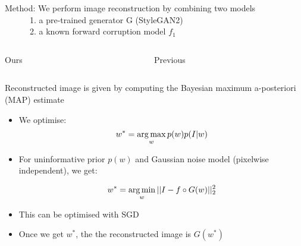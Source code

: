 \begin{frame}{Method: We perform image reconstruction by combining two models\\
\ \ \ \ \ \  1. a pre-trained generator G (StyleGAN2)\\
\ \ \ \ \ \  2. a known forward corruption model $f_1$
}



\begin{columns}[t]
 \begin{column}{0.6\textwidth}
\centering
 
\begin{overprint}
  
  
\end{overprint} 
  Ours
 \end{column}

 \begin{column}{0.3\textwidth}
  \centering

  
  Previous

 
 \end{column}
\end{columns} 
 


 
\end{frame}

\newcommand{\ci}[1]{\circ{#1}}
\newcommand{\wplus}{$\mathcal{W}^{+}$ }
\newcommand{\loss}{\mathcal{L}}

\newcommand{\bit}[1]{\begin{itemize} 
\item #1
\end{itemize}}

\begin{frame}{Reconstructed image is given by computing the Bayesian maximum a-posteriori (MAP) estimate\\
}



\begin{itemize}
 \item We optimise:
$$ w^* = \operatorname*{arg\,max}_w p(w)p(I|w)$$

\item For uninformative prior $p(w)$ and Gaussian noise model (pixelwise independent), we get:

$$ w^* = \operatorname*{arg\,min}_w || I - f \circ G (w) ||_2^2$$

\item This can be optimised with SGD

\item Once we get $w^*$, the the reconstructed image is $G(w^*)$

\end{itemize}

\begin{center}
\vt
{}
\end{center}
 
\end{frame}
% 

